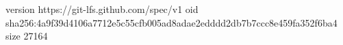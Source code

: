 version https://git-lfs.github.com/spec/v1
oid sha256:4a9f39d4106a7712e5c55cfb005ad8adae2edddd2db7b7ccc8e459fa352f6ba4
size 27164
